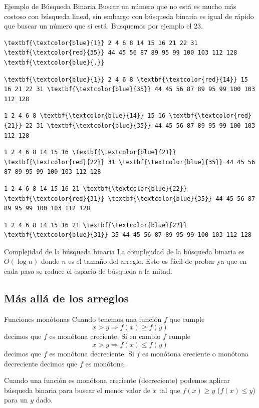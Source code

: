 \documentclass[compress]{beamer}
\begin{document}
\begin{frame}[fragile]{Ejemplo de Búsqueda Binaria}
Buscar un número que no está es mucho más costoso con búsqueda lineal,
sin embargo con búsqueda binaria es igual de rápido que buscar un número que
si está. Busquemos por ejemplo el 23.
\begin{Verbatim}
\textbf{\textcolor{blue}{1}} 2 4 6 8 14 15 16 21 22 31 \textbf{\textcolor{red}{35}} 44 45 56 87 89 95 99 100 103 112 128 \textbf{\textcolor{blue}{.}}
\end{Verbatim}
\pause
\begin{Verbatim}
\textbf{\textcolor{blue}{1}} 2 4 6 8 \textbf{\textcolor{red}{14}} 15 16 21 22 31 \textbf{\textcolor{blue}{35}} 44 45 56 87 89 95 99 100 103 112 128
\end{Verbatim}
\pause
\begin{Verbatim}
1 2 4 6 8 \textbf{\textcolor{blue}{14}} 15 16 \textbf{\textcolor{red}{21}} 22 31 \textbf{\textcolor{blue}{35}} 44 45 56 87 89 95 99 100 103 112 128
\end{Verbatim}
\pause
\begin{Verbatim}
1 2 4 6 8 14 15 16 \textbf{\textcolor{blue}{21}} \textbf{\textcolor{red}{22}} 31 \textbf{\textcolor{blue}{35}} 44 45 56 87 89 95 99 100 103 112 128
\end{Verbatim}
\pause
\begin{Verbatim}
1 2 4 6 8 14 15 16 21 \textbf{\textcolor{blue}{22}} \textbf{\textcolor{red}{31}} \textbf{\textcolor{blue}{35}} 44 45 56 87 89 95 99 100 103 112 128
\end{Verbatim}
\pause
\begin{Verbatim}
1 2 4 6 8 14 15 16 21 \textbf{\textcolor{blue}{22}} \textbf{\textcolor{blue}{31}} 35 44 45 56 87 89 95 99 100 103 112 128
\end{Verbatim}
\end{frame}

\begin{frame}{Complejidad de la búsqueda binaria}
La complejidad de la búsqueda binaria es $O(\log n)$ donde $n$ es el tamaño del
arreglo. Esto es fácil de probar ya que en cada paso se reduce el espacio de
búsqueda a la mitad.
\end{frame}

\subsection{Más allá de los arreglos}

\begin{frame}{Funciones monótonas}
Cuando tenemos una función $f$ que cumple
$$x > y \Rightarrow f(x) \geq f(y)$$
decimos que $f$ es monótona creciente. Si en cambio $f$ cumple
$$x > y \Rightarrow f(x) \leq f(y)$$
decimos que $f$ es monótona decreciente.
Si $f$ es monótona creciente o monótona decreciente decimos que $f$ es monótona.

Cuando una función es monótona creciente (decreciente) podemos aplicar
búsqueda binaria para buscar el menor valor de $x$ tal que
$f(x) \geq y$ ($f(x) \leq y$) para un $y$ dado.
\end{frame}
\end{document}

